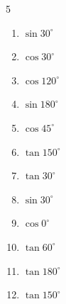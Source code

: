 \begin{multicols}{5}
\begin{enumerate}
        \phantom{$\displaystyle =-1$}

  \item $\displaystyle \sin{30^\circ}$


\columnbreak %

  \item $\displaystyle \cos{30^\circ}$


  \item $\displaystyle \cos{120^\circ}$


  \item $\displaystyle \sin{180^\circ}$

        \phantom{$\displaystyle =0$}

  \item $\displaystyle \cos{45^\circ}$


  \item $\displaystyle \tan{150^\circ}$


  \item $\displaystyle \tan{30^\circ}$


  \item $\displaystyle \sin{30^\circ}$


  \item $\displaystyle \cos{0^\circ}$

        \phantom{$\displaystyle =1$}

  \item $\displaystyle \tan{60^\circ}$


  \item $\displaystyle \tan{180^\circ}$

        \phantom{$\displaystyle =0$}

  \item $\displaystyle \tan{150^\circ}$



\end{enumerate}
\end{multicols}
